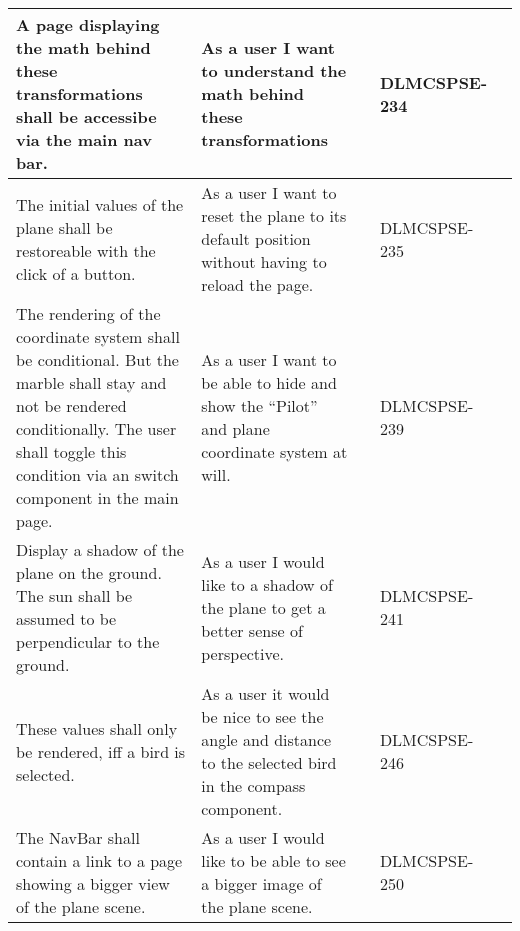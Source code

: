 \begin{xltabular}{\textwidth}{|X|X|M{1.8cm}|M{1.3cm}|M{1.3cm}|}
  A page displaying the math behind these transformations shall be accessibe via the main nav bar. & As a user I want to understand the math behind these transformations &  & {\color{purpleT}\ttfamily DLMCSPSE-234} &  \\ \hline 
  The initial values of the plane shall be restoreable with the click of a button. & As a user I want to reset the plane to its default position without having to reload the page. &  & {\color{purpleT}\ttfamily DLMCSPSE-235} &  \\ \hline 
  The rendering of the coordinate system shall be conditional. \newline But the marble shall stay and not be rendered conditionally. \newline The user shall toggle this condition via an switch component in the main page. & As a user I want to be able to hide and show the “Pilot” and plane coordinate system at will. &  & {\color{purpleT}\ttfamily DLMCSPSE-239} &  \\ \hline 
  Display a shadow of the plane on the ground. \newline The sun shall be assumed to be perpendicular to the ground. & As a user I would like to a shadow of the plane to get a better sense of perspective. &  & {\color{purpleT}\ttfamily DLMCSPSE-241} &  \\ \hline 
  These values shall only be rendered, iff a bird is selected. & As a user it would be nice to see the angle and distance to the selected bird in the compass component. &  & {\color{purpleT}\ttfamily DLMCSPSE-246} &  \\ \hline 
  The NavBar shall contain a link to a page showing a bigger view of the plane scene. & As a user I would like to be able to see a bigger image of the plane scene. &  & {\color{purpleT}\ttfamily DLMCSPSE-250} &  \\ \hline 

\end{xltabular}
